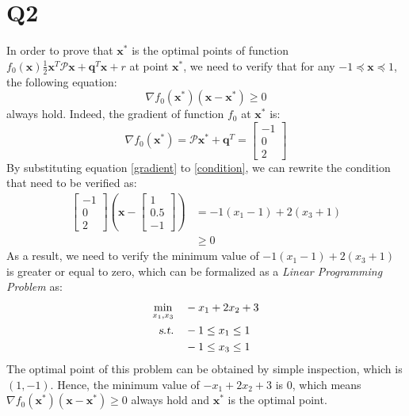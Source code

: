 \documentclass[10pt,a4paper]{article}
\begin{document}
\section*{Q2}
In order to prove that $\mathbf{x}^{*}$ is the optimal points of function $f_{0}(\mathbf{x})\frac{1}{2} \mathbf{x}^{T} \mathcal{P} \mathbf{x} + \mathbf{q}^{T} \mathbf{x} + r$ at point $\mathbf{x}^{*}$, we need to verify that for any $-1 \preceq \mathbf{x} \preceq 1$, the following equation:
\begin{equation}
	\nabla f_{0}(\mathbf{x}^{*})(\mathbf{x} - \mathbf{x}^{*}) \geq 0
	\label{condition}
\end{equation}
always hold. Indeed, the gradient of function $f_{0}$ at $\mathbf{x}^{*}$ is:
\begin{equation}
	\nabla f_{0}(\mathbf{x}^{*}) = \mathcal{P} \mathbf{x}^{*} + \mathbf{q}^{T} = 		\begin{bmatrix}
	-1 \\
	0\\
	2
	\end{bmatrix}
	\label{gradient}
\end{equation}
By substituting equation \ref{gradient} to \ref{condition}, we can rewrite the condition that need to be verified as:
\begin{equation}
	\begin{aligned}
		\begin{bmatrix}
			-1 \\
			0 \\
			2
		\end{bmatrix} (\mathbf{x} - \begin{bmatrix}
		1 \\
		0.5 \\
		-1
		\end{bmatrix}) &= -1(x_{1} - 1) + 2(x_{3} + 1) \\
		& \geq 0
	\end{aligned}
\end{equation}
As a result, we need to verify the minimum value of $-1(x_{1} - 1) + 2(x_{3} + 1)$ is greater or equal to zero, which can be formalized as a \textit{Linear Programming Problem} as:
\begin{equation}
	\begin{aligned}
		\displaystyle\min_{x_{1}, x_{3}} \quad & -x_{1} + 2x_{2} + 3 \\
		\textsl{s.t.} \quad & -1 \leq x_{1} \leq 1 \\
		& -1 \leq x_{3} \leq 1
	\end{aligned}
\end{equation}
The optimal point of this problem can be obtained by simple inspection, which is $(1, -1)$. Hence, the minimum value of $-x_{1} + 2x_{2} + 3$ is 0, which means $\nabla f_{0}(\mathbf{x}^{*})(\mathbf{x} - \mathbf{x}^{*}) \geq 0$ always hold and $\mathbf{x}^{*}$ is the optimal point.
\end{document}
